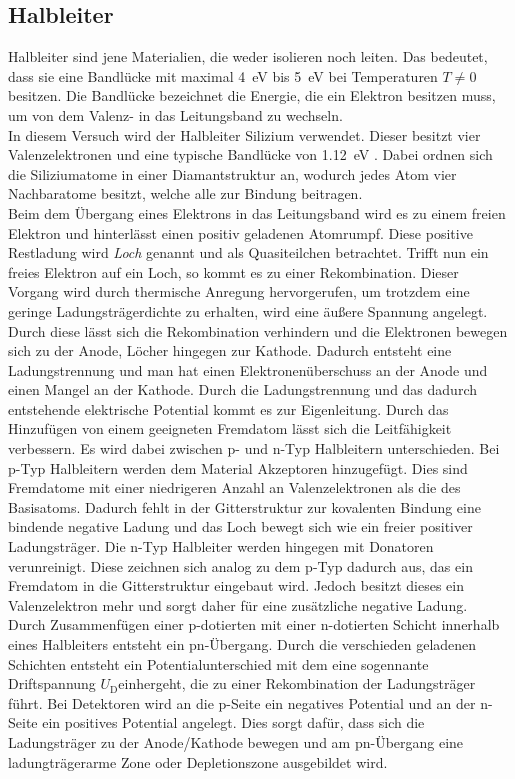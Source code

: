 \subsection{Halbleiter}
\label{sec:Halbleiter-Theorie}
Halbleiter sind jene Materialien, die weder isolieren noch leiten. Das bedeutet, dass sie eine Bandlücke mit maximal \SI{4}{\electronvolt} bis \SI{5}{\electronvolt} bei Temperaturen $T \neq 0$ besitzen. Die Bandlücke bezeichnet die Energie, die ein Elektron besitzen muss, um von dem Valenz- in das Leitungsband zu wechseln.\\
In diesem Versuch wird der Halbleiter Silizium verwendet. Dieser besitzt vier
Valenzelektronen und eine typische Bandlücke von \SI{1.12}{\electronvolt} \cite{chemie}. Dabei ordnen sich die Siliziumatome in einer Diamantstruktur an, wodurch jedes Atom vier Nachbaratome besitzt, welche alle zur Bindung
beitragen.\\
Beim dem Übergang eines Elektrons in das Leitungsband wird es zu einem freien Elektron und hinterlässt einen positiv geladenen Atomrumpf. Diese positive Restladung wird \textit{Loch} genannt und als Quasiteilchen betrachtet. Trifft nun ein freies Elektron auf ein Loch, so kommt es zu einer Rekombination. Dieser Vorgang wird durch thermische Anregung hervorgerufen, um trotzdem eine geringe Ladungsträgerdichte zu erhalten, wird eine äußere Spannung angelegt. Durch diese lässt sich die Rekombination verhindern und die Elektronen bewegen sich zu der Anode, Löcher hingegen zur Kathode. Dadurch entsteht eine Ladungstrennung und man hat einen Elektronenüberschuss an der Anode und einen Mangel an der Kathode. Durch die Ladungstrennung und das dadurch entstehende elektrische Potential kommt es zur Eigenleitung.
Durch das Hinzufügen von einem geeigneten Fremdatom lässt sich die Leitfähigkeit verbessern. Es wird dabei zwischen p- und n-Typ Halbleitern unterschieden.
Bei p-Typ Halbleitern werden dem Material Akzeptoren hinzugefügt. Dies sind Fremdatome mit einer niedrigeren Anzahl an Valenzelektronen als die des Basisatoms. Dadurch fehlt in der Gitterstruktur zur kovalenten Bindung eine bindende negative Ladung und das Loch bewegt sich wie ein freier positiver Ladungsträger.
Die n-Typ Halbleiter werden hingegen mit Donatoren verunreinigt. Diese zeichnen sich analog zu dem p-Typ dadurch aus, das ein Fremdatom in die Gitterstruktur eingebaut wird. Jedoch besitzt dieses ein Valenzelektron mehr und sorgt daher für eine zusätzliche negative Ladung.\\
Durch Zusammenfügen einer p-dotierten mit einer n-dotierten Schicht innerhalb eines Halbleiters entsteht ein pn-Übergang. Durch die verschieden geladenen Schichten entsteht ein Potentialunterschied mit dem eine sogennante Driftspannung $U_\text{D}$einhergeht, die zu einer Rekombination der Ladungsträger führt. Bei Detektoren wird an die p-Seite ein negatives Potential und an der n-Seite ein positives Potential angelegt. Dies sorgt dafür, dass sich die Ladungsträger zu der Anode/Kathode bewegen und am pn-Übergang eine ladungträgerarme Zone oder Depletionszone ausgebildet wird.
